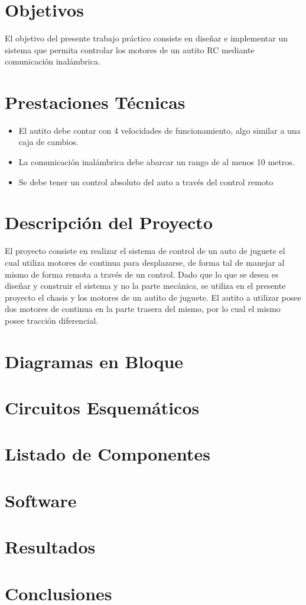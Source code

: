 \documentclass[a4paper,10pt]{article}
\title{  }
\begin{document}
	\maketitle %
	\newpage

	\tableofcontents %
	\newpage

	\section{Objetivos}
		El objetivo del presente trabajo práctico consiste en diseñar e implementar un sistema que permita controlar los motores de un autito RC mediante 
		comunicación inalámbrica. 

	\section{Prestaciones Técnicas}
		\begin{itemize}
			\item El autito debe contar con 4 velocidades de funcionamiento, algo similar a una caja de cambios.
			\item La comunicación inalámbrica debe abarcar un rango de al menos 10 metros. 
			\item Se debe tener un control absoluto del auto a través del control remoto
		\end{itemize} 

	\section{Descripción del Proyecto}
		El proyecto consiste en realizar el sistema de control de un auto de juguete el cual utiliza motores de continua para desplazarse, de forma tal de manejar 
		al mismo de forma remota a través de un control. Dado que lo que se desea es diseñar y construir el sistema y no la parte mecánica, se utiliza en el presente
		proyecto  el chasis y los motores de un autito de juguete. El autito a utilizar posee dos motores de continua en la parte trasera del mismo, por lo cual
		el mismo posee tracción diferencial. 	
	
		
	\section{Diagramas en Bloque}
	\section{Circuitos Esquemáticos}
	\section{Listado de Componentes}
	\section{Software}
	\section{Resultados}
	\section{Conclusiones}
\end{document}
